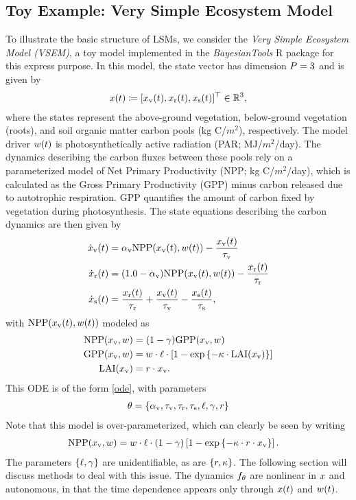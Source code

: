 \documentclass[12pt]{article}
\begin{document}
\subsection{Toy Example: Very Simple Ecosystem Model} \label{vsem}
To illustrate the basic structure of LSMs, we consider the \textit{Very Simple Ecosystem Model (VSEM)}, a toy model implemented 
in the \textit{BayesianTools} R package for this express purpose. In this model, the state vector has dimension $P=3$ and is given by 
\begin{align*}
x(t) \coloneqq [x_{\textrm{v}}(t), x_{\textrm{r}}(t), x_{\textrm{s}}(t)]^\top \in \mathbb{R}^{3}, 
\end{align*}
where the states represent the above-ground vegetation, below-ground vegetation (roots), and soil organic matter 
carbon pools (\textrm{kg C/$m^2$}), respectively. The model driver $w(t)$ is photosynthetically active radiation 
(PAR; \textrm{MJ/$m^2$/day}). The dynamics describing the carbon fluxes between these pools rely on a parameterized model 
of Net Primary Productivity (NPP; \textrm{kg C/$m^2$/day}), 
which is calculated as the Gross Primary Productivity (GPP) minus carbon released due to autotrophic respiration.
GPP quantifies the amount of carbon fixed by vegetation during photosynthesis.
The state equations describing the carbon dynamics are then given by
\begin{align}
\dot{x}_{\textrm{v}}(t) &= \alpha_{\textrm{v}} \textrm{NPP}(x_{\textrm{v}}(t), w(t)) - \frac{x_{\textrm{v}}(t)}{\tau_{\textrm{v}}} \\
\dot{x}_{\textrm{r}}(t) &= (1.0 - \alpha_{\textrm{v}}) \textrm{NPP}(x_{\textrm{v}}(t), w(t)) - \frac{x_{\textrm{r}}(t)}{\tau_{\textrm{r}}} \nonumber \\ 
\dot{x}_{\textrm{s}}(t) &= \frac{x_{\textrm{r}}(t)}{\tau_{\textrm{r}}} + \frac{x_{\textrm{v}}(t)}{\tau_{\textrm{v}}} - \frac{x_{\textrm{s}}(t)}{\tau_{\textrm{s}}}, \nonumber
\end{align}
with $\textrm{NPP}(x_{\textrm{v}}(t), w(t))$ modeled as
\begin{align}
\textrm{NPP}(x_{\textrm{v}}, w) &= (1 - \gamma) \textrm{GPP}(x_{\textrm{v}}, w) \\
\textrm{GPP}(x_{\textrm{v}}, w) &= w \cdot \ell \cdot \left[1 - \exp\left\{-\kappa \cdot \textrm{LAI}(x_{\textrm{v}}) \right\} \right] \nonumber \\
\textrm{LAI}(x_{\textrm{v}}) &= r \cdot x_{\textrm{v}}. \nonumber
\end{align} 
This ODE is of the form \ref{ode}, with parameters
\begin{align}
\theta = \{\alpha_{\textrm{v}}, \tau_{\textrm{v}}, \tau_{\textrm{r}}, \tau_{\textrm{s}}, \ell, \gamma, r\} \label{vsem_param}
\end{align}
Note that this model is over-parameterized, which can clearly be seen by writing 
\begin{align}
\textrm{NPP}(x_{\textrm{v}}, w) &= w \cdot \ell \cdot (1 - \gamma) \left[1 - \exp\left\{-\kappa \cdot r \cdot x_{\textrm{v}}\right\} \right]. 
\end{align}
The parameters $\{\ell, \gamma\}$ are unidentifiable, as are $\{r, \kappa\}$. The following section will discuss methods 
to deal with this issue. 
The dynamics $f_{\theta}$ are nonlinear in $x$ and autonomous, in that the 
time dependence appears only through $x(t)$ and $w(t)$. 
\end{document}

